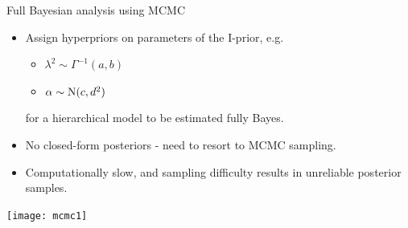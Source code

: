 \begin{frame}{Full Bayesian analysis using MCMC}
  \vspace{-3pt}
  \begin{itemize}\setlength\itemsep{0.5em}
    \item Assign hyperpriors on parameters of the I-prior, e.g.
    \begin{itemize}
      \item $\lambda^2 \sim \Gamma^{-1}(a,b)$
      \item $\alpha \sim \operatorname{N}(c,d^2)$
    \end{itemize}
    for a hierarchical model to be estimated fully Bayes.
    \item No closed-form posteriors - need to resort to MCMC sampling.
    \item Computationally slow, and sampling difficulty results in unreliable posterior samples.
  \end{itemize}
  \begin{center}
    \texttt{[image: mcmc1]}
  \end{center}
\end{frame}








